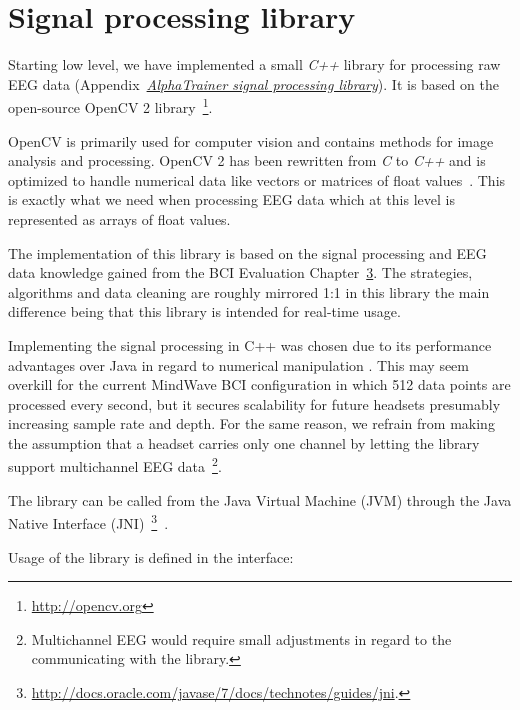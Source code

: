 \documentclass[a4paper,10pt,english,lof,lot,twoside]{puthesis}
\begin{document}
\section{Signal processing library}
\label{ch-implementation/index:ch-implementation-signal-processing-library}\label{ch-implementation/index:signal-processing-library}
Starting low level, we have implemented a small \emph{C++} library for processing raw
EEG data (Appendix {\hyperref[appendix_software:appendix-alphatrainer-signal-processing-library]{\emph{AlphaTrainer signal processing library}}}). It is based on the
open-source OpenCV 2 library \footnote{
\href{http://opencv.org}{http://opencv.org}
}.

OpenCV is primarily used for computer vision and contains methods for image
analysis and processing. OpenCV 2 has been rewritten from \emph{C} to \emph{C++} and is
optimized to handle numerical data like vectors or matrices of float values \cite{baggio_mastering_2012}. This is exactly what we need when
processing EEG data which at this level is represented as
arrays of float values.

The implementation of this library is based on the signal processing and EEG
data knowledge gained from the BCI Evaluation Chapter {\hyperref[ch-experiment/index:ch-experiment]{3}}. The strategies, algorithms and data cleaning are roughly
mirrored 1:1 in this library the main difference being that this library is
intended for real-time usage.

Implementing the signal processing in C++ was chosen due to its performance
advantages over Java in regard to numerical manipulation
\cite{ratabouil_android_2012}. This may seem overkill for the current
MindWave BCI configuration in which 512 data points are processed every second,
but it secures scalability for future headsets presumably increasing sample rate
and depth. For the same reason, we refrain from making the assumption that a headset
carries only one channel by letting the library support multichannel EEG data \footnote{
Multichannel EEG would require small adjustments in regard to the communicating with the library.
}.

The library can be called from the Java Virtual Machine (JVM) through the Java
Native Interface (JNI) \footnote{
\href{http://docs.oracle.com/javase/7/docs/technotes/guides/jni}{http://docs.oracle.com/javase/7/docs/technotes/guides/jni}.
} \cite{liu_android_2013}.

Usage of the library is defined in the  interface:
\end{document}
